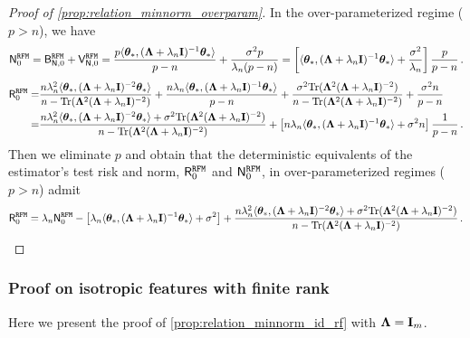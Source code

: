 \begin{proof}[Proof of \cref{prop:relation_minnorm_overparam}]
In the over-parameterized regime ($p > n$), we have
\[
    \mathsf N_{0}^{\tt RFM} 
    = 
    \mathsf B^{\tt RFM}_{\mathsf N,0} + \mathsf V^{\tt RFM}_{\mathsf N,0} 
    = 
    \frac{p\langle{\boldsymbol \theta}_*, ( {\boldsymbol \Lambda} + \lambda_n{\mathbf I})^{-1} {\boldsymbol \theta}_*\rangle}{p-n} + \frac{\sigma^2p}{\lambda_n(p-n)} 
    = 
    \left[\langle{\boldsymbol \theta}_*, ( {\boldsymbol \Lambda} + \lambda_n{\mathbf I})^{-1} {\boldsymbol \theta}_*\rangle + \frac{\sigma^2}{\lambda_n}\right] \frac{p}{p-n}\,.
\]
\[
\begin{aligned}
    \mathsf R_{0}^{\tt RFM} 
    =&
    \frac{n\lambda_n^2 \langle{\boldsymbol \theta}_*, ( {\boldsymbol \Lambda} + \lambda_n {\mathbf I})^{-2} {\boldsymbol \theta}_*\rangle}{ n - {\rm Tr}({\boldsymbol \Lambda}^2({\boldsymbol \Lambda}+\lambda_n{\mathbf I})^{-2})} 
    + 
    \frac{n\lambda_n \langle{\boldsymbol \theta}_*, ( {\boldsymbol \Lambda} + \lambda_n{\mathbf I})^{-1} {\boldsymbol \theta}_*\rangle}{p-n}
    + 
    \frac{\sigma^2{\rm Tr}({\boldsymbol \Lambda}^2({\boldsymbol \Lambda}+\lambda_n{\mathbf I})^{-2})}{n - {\rm Tr}({\boldsymbol \Lambda}^2({\boldsymbol \Lambda}+\lambda_n{\mathbf I})^{-2})} 
    + 
    \frac{\sigma^2n}{p-n}\\
    =& 
    \frac{n\lambda_n^2 \langle{\boldsymbol \theta}_*, ( {\boldsymbol \Lambda} + \lambda_n {\mathbf I})^{-2} {\boldsymbol \theta}_*\rangle + \sigma^2{\rm Tr}({\boldsymbol \Lambda}^2({\boldsymbol \Lambda}+\lambda_n{\mathbf I})^{-2})}{ n - {\rm Tr}({\boldsymbol \Lambda}^2({\boldsymbol \Lambda}+\lambda_n{\mathbf I})^{-2})} 
    + 
    \left[n\lambda_n \langle{\boldsymbol \theta}_*, ( {\boldsymbol \Lambda} + \lambda_n{\mathbf I})^{-1} {\boldsymbol \theta}_*\rangle + \sigma^2n\right]\frac{1}{p-n}\,.
\end{aligned}
\]
Then we eliminate $p$ and obtain that the deterministic equivalents of the estimator's test risk and norm, $\mathsf R^{\tt RFM}_{0}$ and $\mathsf N^{\tt RFM}_{0}$, in over-parameterized regimes ($p>n$) admit
\[
\mathsf R_{0}^{\tt RFM} 
= 
\lambda_n\mathsf N_{0}^{\tt RFM} 
- 
\left[\lambda_n\langle{\boldsymbol \theta}_*, ( {\boldsymbol \Lambda} + \lambda_n{\mathbf I})^{-1} {\boldsymbol \theta}_*\rangle + \sigma^2\right] 
+ 
\frac{n\lambda_n^2 \langle{\boldsymbol \theta}_*, ( {\boldsymbol \Lambda} + \lambda_n {\mathbf I})^{-2} {\boldsymbol \theta}_*\rangle + \sigma^2{\rm Tr}({\boldsymbol \Lambda}^2({\boldsymbol \Lambda}+\lambda_n{\mathbf I})^{-2})}{ n - {\rm Tr}({\boldsymbol \Lambda}^2({\boldsymbol \Lambda}+\lambda_n{\mathbf I})^{-2})}\,. 
\]
\end{proof}


\subsubsection{Proof on isotropic features with finite rank}
Here we present the proof of \cref{prop:relation_minnorm_id_rf} with \( {\boldsymbol \Lambda} = {\mathbf I}_m \).

